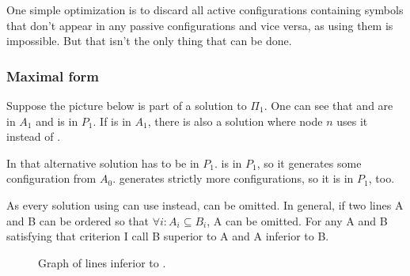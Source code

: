 \documentclass[english, 12pt, a4paper, sci, utf8, a-1b, online]{aaltothesis}
\begin{document}
One simple optimization is to discard all active configurations containing symbols that don't appear in any passive configurations and vice versa, as using them is impossible. But that isn't the only thing that can be done.

\subsubsection{Maximal form}

Suppose the picture below is part of a solution to $\Pi_{1}$. One can see that  and  are in $A_{1}$ and  is in $P_{1}$. If  is in $A_{1}$, there is also a solution where node $n$ uses it instead of .


In that alternative solution  has to be in $P_{1}$.  is in $P_{1}$, so it generates some configuration from $A_{0}$.  generates strictly more configurations, so it is in $P_{1}$, too.

As every solution using  can use  instead,  can be omitted. In general, if two lines A and B can be ordered so that $\forall i : A_i \subseteq B_i$, A can be omitted.\cite{DA2020} For any A and B satisfying that criterion I call B superior to A and A inferior to B.

\begin{figure}[h]
  \centering
  \caption{Graph of lines inferior to .}
\end{figure}
\end{document}
